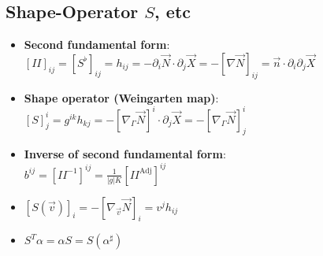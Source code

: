 \documentclass{scrartcl}
\begin{document}
    \subsection{Shape-Operator \( S \), etc}
    \begin{itemize}
      \item \textbf{Second fundamental form}:\\
        \( [I\!I]_{ij} = [S^{\flat}]_{ij} = h_{ij} = -\partial_{i}\vec{N}\cdot\partial_{j}\vec{X} 
                      = -\left[ \nabla\vec{N} \right]_{ij}
                      = \vec{n} \cdot \partial_{i}\partial_{j}\vec{X} \)
      \item \textbf{Shape operator (Weingarten map)}:\\
        \( \left[ S \right]^{i}_{j} = g^{ik}h_{kj} = -\left[ \nabla_{\Gamma}\vec{N}\right]^{i} \cdot \partial_{j}\vec{X}
                                    = -\left[\nabla_{\Gamma}\vec{N}\right]^{i}_{j} \)
      \item \textbf{Inverse of second fundamental form}: \\
        \( b^{ij} = \left[ I\!I^{-1}\right]^{ij} = \frac{1}{|g|K}\left[ I\!I^{\text{Adj}}\right]^{ij} \)
      \item \( \left[S(\vec{v})\right]_{i} = -\left[ \nabla_{\vec{v}}\vec{N}\right]_{i} = v^{j}h_{ij} \)
      \item \( S^{T}\alpha = \alpha S =  S(\alpha^{\sharp})   \)
    \end{itemize}
\end{document}
